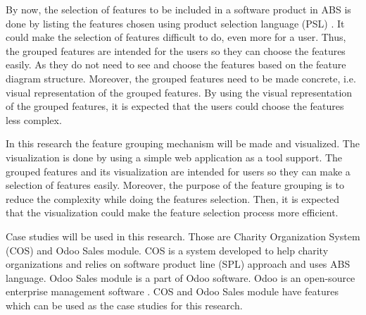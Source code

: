 By now, the selection of features to be included in a software product in ABS is done by listing the features chosen using product selection language (PSL) \citep{paper.hanle.ABStutorial}. It could make the selection of features difficult to do, even more for a user. Thus, the grouped features are intended for the users so they can choose the features easily. As they do not need to see and choose the features based on the feature diagram structure. Moreover, the grouped features need to be made concrete, i.e. visual representation of the grouped features. By using the visual representation of the grouped features, it is expected that the users could choose the features less complex.

In this research the feature grouping mechanism will be made and visualized. The visualization is done by using a simple web application as a tool support. The grouped features and its visualization are intended for users so they can make a selection of features easily. Moreover, the purpose of the feature grouping is to reduce the complexity while doing the features selection. Then, it is expected that the visualization could make the feature selection process more efficient.

Case studies will be used in this research. Those are Charity Organization System (COS) and Odoo Sales module. COS is a system developed to help charity organizations and relies on software product line (SPL) approach and uses ABS language. Odoo Sales module is a part of Odoo software. Odoo is an open-source \citep{web.Odoo.whatIsOdoo,web.Odoo.ERPComparison} enterprise management software \citep{web.Odoo.whatIsOdoo}. COS and Odoo Sales module have features which can be used as the case studies for this research.

